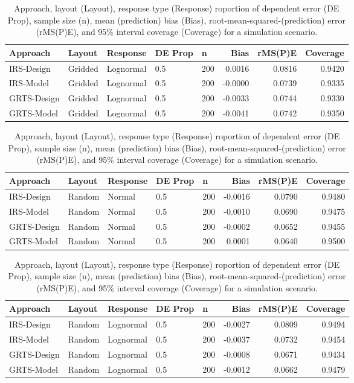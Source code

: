 \documentclass[]{elsarticle} %
\begin{document}
\begin{table}[ht]
\centering
\begin{tabular}{lllllrrr}
  \hline
Approach & Layout & Response & DE Prop & n & Bias & rMS(P)E & Coverage \\ 
  \hline
IRS-Design & Gridded & Lognormal & 0.5 & 200 & 0.0016 & 0.0816 & 0.9420 \\ 
  IRS-Model & Gridded & Lognormal & 0.5 & 200 & -0.0000 & 0.0739 & 0.9335 \\ 
  GRTS-Design & Gridded & Lognormal & 0.5 & 200 & -0.0033 & 0.0744 & 0.9330 \\ 
  GRTS-Model & Gridded & Lognormal & 0.5 & 200 & -0.0041 & 0.0742 & 0.9350 \\ 
   \hline
\end{tabular}
\caption{Approach, layout (Layout), response type (Response) roportion of dependent error (DE Prop), sample size (n), mean (prediction) bias (Bias), root-mean-squared-(prediction) error (rMS(P)E), and 95\% interval coverage (Coverage) for a simulation scenario.} 
\end{table}
\begin{table}[ht]
\centering
\begin{tabular}{lllllrrr}
  \hline
Approach & Layout & Response & DE Prop & n & Bias & rMS(P)E & Coverage \\ 
  \hline
IRS-Design & Random & Normal & 0.5 & 200 & -0.0016 & 0.0790 & 0.9480 \\ 
  IRS-Model & Random & Normal & 0.5 & 200 & -0.0010 & 0.0690 & 0.9475 \\ 
  GRTS-Design & Random & Normal & 0.5 & 200 & -0.0002 & 0.0652 & 0.9455 \\ 
  GRTS-Model & Random & Normal & 0.5 & 200 & 0.0001 & 0.0640 & 0.9500 \\ 
   \hline
\end{tabular}
\caption{Approach, layout (Layout), response type (Response) roportion of dependent error (DE Prop), sample size (n), mean (prediction) bias (Bias), root-mean-squared-(prediction) error (rMS(P)E), and 95\% interval coverage (Coverage) for a simulation scenario.} 
\end{table}
\begin{table}[ht]
\centering
\begin{tabular}{lllllrrr}
  \hline
Approach & Layout & Response & DE Prop & n & Bias & rMS(P)E & Coverage \\ 
  \hline
IRS-Design & Random & Lognormal & 0.5 & 200 & -0.0027 & 0.0809 & 0.9494 \\ 
  IRS-Model & Random & Lognormal & 0.5 & 200 & -0.0037 & 0.0732 & 0.9454 \\ 
  GRTS-Design & Random & Lognormal & 0.5 & 200 & -0.0008 & 0.0671 & 0.9434 \\ 
  GRTS-Model & Random & Lognormal & 0.5 & 200 & -0.0012 & 0.0662 & 0.9479 \\ 
   \hline
\end{tabular}
\caption{Approach, layout (Layout), response type (Response) roportion of dependent error (DE Prop), sample size (n), mean (prediction) bias (Bias), root-mean-squared-(prediction) error (rMS(P)E), and 95\% interval coverage (Coverage) for a simulation scenario.} 
\end{table}
\end{document}
